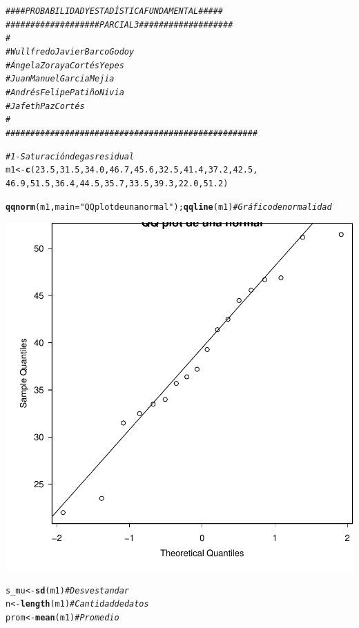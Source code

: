 \documentclass{article}\usepackage[]{graphicx}\usepackage[]{color}
\makeatletter
\newcommand{\hlnum}[1]{\textcolor[rgb]{0.686,0.059,0.569}{#1}}%
\newcommand{\hlstr}[1]{\textcolor[rgb]{0.192,0.494,0.8}{#1}}%
\newcommand{\hlcom}[1]{\textcolor[rgb]{0.678,0.584,0.686}{\textit{#1}}}%
\newcommand{\hlstd}[1]{\textcolor[rgb]{0.345,0.345,0.345}{#1}}%
\newcommand{\hlkwb}[1]{\textcolor[rgb]{0.69,0.353,0.396}{#1}}%
\newcommand{\hlkwc}[1]{\textcolor[rgb]{0.333,0.667,0.333}{#1}}%
\newcommand{\hlkwd}[1]{\textcolor[rgb]{0.737,0.353,0.396}{\textbf{#1}}}%
\newenvironment{kframe}{%
 \def\at@end@of@kframe{}%
 \ifinner\ifhmode%
  \def\at@end@of@kframe{\end{minipage}}%
  \begin{minipage}{\columnwidth}%
 \fi\fi%
 \def\FrameCommand##1{\hskip\@totalleftmargin \hskip-\fboxsep
 \colorbox{shadecolor}{##1}\hskip-\fboxsep
     \hskip-\linewidth \hskip-\@totalleftmargin \hskip\columnwidth}%
 \MakeFramed {\advance\hsize-\width
   \@totalleftmargin\z@ \linewidth\hsize
   \@setminipage}}%
 {\par\unskip\endMakeFramed%
 \at@end@of@kframe}
\newenvironment{knitrout}{}{} %
\makeatother
\begin{document}
\begin{knitrout}
\color{fgcolor}\begin{kframe}
\begin{alltt}
\hlcom{#### PROBABILIDAD Y ESTADÍSTICA FUNDAMENTAL  #####}
\hlcom{###################  PARCIAL 3  ###################}
\hlcom{#}
\hlcom{# Wullfredo Javier Barco Godoy}
\hlcom{# Ángela Zoraya Cortés Yepes}
\hlcom{# Juan Manuel Garcia Mejia}
\hlcom{# Andrés Felipe Patiño Nivia}
\hlcom{# Jafeth Paz Cortés}
\hlcom{#}
\hlcom{###################################################}


\hlcom{# 1 - Saturación de gas residual}
\hlstd{m1} \hlkwb{<-} \hlkwd{c}\hlstd{(}\hlnum{23.5}\hlstd{,} \hlnum{31.5}\hlstd{,} \hlnum{34.0}\hlstd{,} \hlnum{46.7}\hlstd{,} \hlnum{45.6}\hlstd{,} \hlnum{32.5}\hlstd{,} \hlnum{41.4}\hlstd{,} \hlnum{37.2}\hlstd{,} \hlnum{42.5}\hlstd{,}
        \hlnum{46.9}\hlstd{,} \hlnum{51.5}\hlstd{,} \hlnum{36.4}\hlstd{,} \hlnum{44.5}\hlstd{,} \hlnum{35.7}\hlstd{,} \hlnum{33.5}\hlstd{,} \hlnum{39.3}\hlstd{,} \hlnum{22.0}\hlstd{,} \hlnum{51.2}\hlstd{)}

\hlkwd{qqnorm}\hlstd{(m1,} \hlkwc{main}\hlstd{=}\hlstr{"QQ plot de una normal"}\hlstd{);} \hlkwd{qqline}\hlstd{(m1)} \hlcom{# Gráfico de normalidad}
\end{alltt}
\end{kframe}

{\centering \includegraphics[width=.6\linewidth]{figure/Parcial-3-Rnwauto-report-1} 

}


\begin{kframe}\begin{alltt}
\hlstd{s_mu} \hlkwb{<-} \hlkwd{sd}\hlstd{(m1)} \hlcom{# Desv estandar}
\hlstd{n} \hlkwb{<-} \hlkwd{length}\hlstd{(m1)} \hlcom{# Cantidad de datos}
\hlstd{prom} \hlkwb{<-} \hlkwd{mean}\hlstd{(m1)} \hlcom{# Promedio}


\end{alltt}
\end{kframe}
\end{knitrout}
\end{document}
